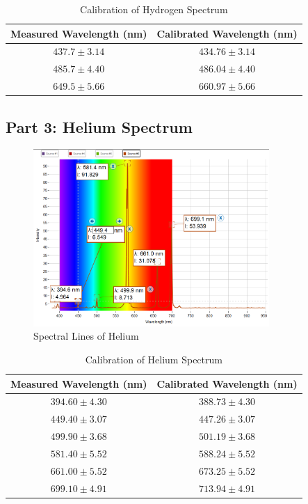 \begin{table}[H]
    \centering
    \begin{tabular}{|c|c|}
        \hline
        Measured Wavelength (nm) & Calibrated Wavelength (nm) \\
        \hline
        $437.7 \pm 3.14$ & $434.76 \pm 3.14$ \\
        $485.7 \pm 4.40$ & $486.04 \pm 4.40$ \\
        $649.5 \pm 5.66$ & $660.97 \pm 5.66$ \\
        \hline
    \end{tabular}
    \caption{Calibration of Hydrogen Spectrum}
\end{table}

\subsection{Part 3: Helium Spectrum}
\begin{figure}[H]    \centering
    \includegraphics[width=0.8\textwidth]{Results/photospectrometry/helium.png}
    \caption{Spectral Lines of Helium}
    \label{fig:helium_spectrum}
\end{figure}

\begin{table}[H]
    \centering
    \begin{tabular}{|c|c|}
        \hline
        Measured Wavelength (nm) & Calibrated Wavelength (nm) \\
        \hline
        $394.60 \pm 4.30$ & $388.73 \pm 4.30$ \\
        $449.40 \pm 3.07$ & $447.26 \pm 3.07$ \\
        $499.90 \pm 3.68$ & $501.19 \pm 3.68$ \\
        $581.40 \pm 5.52$ & $588.24 \pm 5.52$ \\
        $661.00 \pm 5.52$ & $673.25 \pm 5.52$ \\
        $699.10 \pm 4.91$ & $713.94 \pm 4.91$ \\
        \hline
    \end{tabular}
    \caption{Calibration of Helium Spectrum}\end{table}

